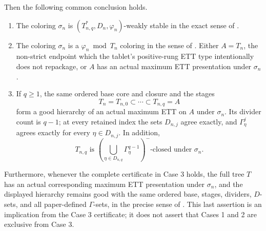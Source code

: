 \begin{lemma}
Then the following common conclusion holds.
\begin{enumerate}
\item The coloring $\sigma_n$ is
$(T_{n,q}^{*},D_n,\varphi_n)$-weakly stable in the exact sense of
.
\item The coloring $\sigma_n$ is a
$\varphi_n\bmod T_n$ coloring in the sense of .
Either $A=T_n$, the non-strict endpoint which the tablet's positive-rung
ETT type intentionally does not repackage, or $A$ has an actual maximum
ETT presentation under $\sigma_n$.
\item If $q\geq1$, the same ordered base core and closure and the stages
\[
 T_n=T_{n,0}\subset\cdots\subset T_{n,q}=A
\]
form a good hierarchy of an actual maximum ETT on $A$ under $\sigma_n$.
Its divider count is $q-1$; at every retained index the sets $D_{n,j}$
agree exactly, and $\Gamma^j_\eta$ agrees exactly for every
$\eta\in D_{n,j}$.  In addition,
\[
 T_{n,q}\text{ is }
 \left(\bigcup_{\eta\in D_{n,q}}\Gamma^{q-1}_\eta\right)^{-}
 \text{-closed under }\sigma_n.                              \tag{M}
\]
\end{enumerate}
Furthermore, whenever the complete certificate in Case 3 holds, the
full tree $T$ has an actual corresponding maximum ETT presentation under
$\sigma_n$, and the displayed hierarchy remains good with the same
ordered base, stages, dividers, $D$-sets, and all paper-defined
$\Gamma$-sets, in the precise sense of .
This last assertion is an implication from the Case 3 certificate; it
does not assert that Cases 1 and 2 are exclusive from Case 3.
\end{lemma}
